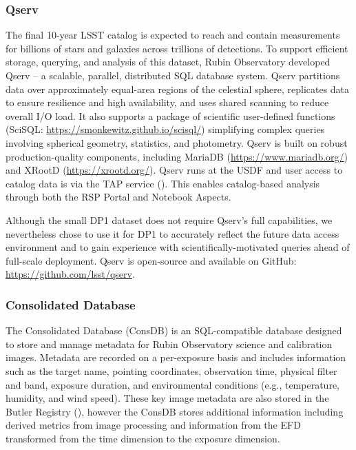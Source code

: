 \subsubsection{Qserv}
\label{sssec:qserv}
The final 10-year \gls{LSST} catalog is expected to reach \tenyearcatalogsize and contain measurements for billions of stars and galaxies across trillions of detections.
To support efficient storage, querying, and analysis of this dataset,  Rubin Observatory developed Qserv \citep{Wang:2011:QDS:2063348.2063364, C15_adassxxxii} -- a scalable, parallel, distributed SQL database system.
\gls{Qserv} partitions data over approximately equal-area regions of the celestial sphere, replicates data to ensure resilience and high availability, and uses shared scanning to reduce overall I/O load.
It also supports a package of scientific user-defined functions (SciSQL: \url{https://smonkewitz.github.io/scisql/}) simplifying complex queries involving spherical geometry, statistics, and photometry.
\gls{Qserv} is built on robust production-quality components, including MariaDB (\url{https://www.mariadb.org/}) and XRootD (\url{https://xrootd.org/}).
Qserv runs at the \gls{USDF} and user access to catalog data is via the TAP service ().
This enables catalog-based analysis through both the \gls{RSP} Portal and Notebook Aspects.

Although the small \gls{DP1} dataset does not require Qserv’s full capabilities, we nevertheless chose to use it for \gls{DP1} to accurately reflect the future data access environment and to gain experience with scientifically-motivated queries ahead of full-scale deployment.
\gls{Qserv} is open-source and available on GitHub: \url{https://github.com/lsst/qserv}.

\subsubsection{Consolidated Database}
\label{sssec:consdb}

The Consolidated Database (ConsDB) \citep{dmtn-227} is an SQL-compatible database designed to store and manage metadata for Rubin Observatory science and calibration images.
Metadata are recorded on a per-exposure basis and includes information such as the target name, pointing coordinates, observation time, physical filter and band, exposure duration, and environmental conditions (e.g., temperature, humidity, and wind speed).
These key image metadata are also stored in the Butler Registry (), however the ConsDB stores additional information  including derived metrics from image processing and information from the \gls{EFD} transformed from the time dimension to the exposure dimension.

